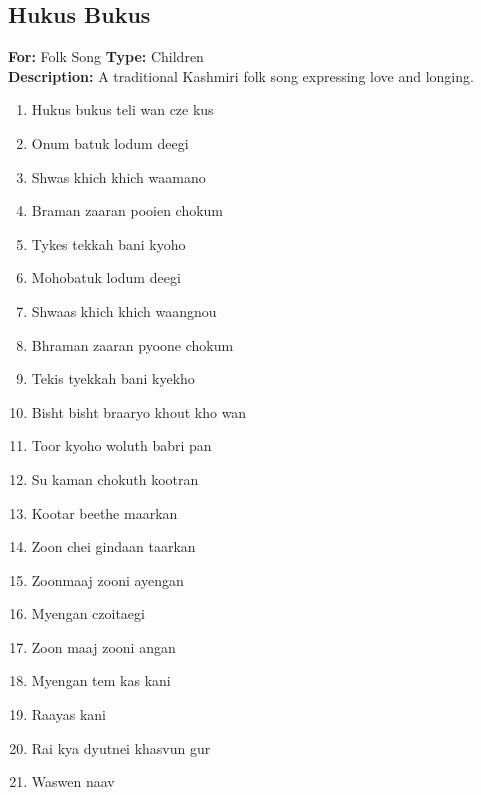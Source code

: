 \documentclass[12pt]{article}
\newcommand{\bigroman}[1]{\fontsize{16pt}{18pt}\selectfont\RaggedRight #1}
\begin{document}
\subsection*{Hukus Bukus}
\textbf{For:} Folk Song \quad \textbf{Type:} Children\\
\textbf{Description:} A traditional Kashmiri folk song expressing love and longing.

\begin{multicols}{2}
\begin{enumerate}[leftmargin=*, label=\arabic*., font=\fontsize{16pt}{18pt}\selectfont]
  \item \bigroman{Hukus bukus teli wan cze kus}
  \item \bigroman{Onum batuk lodum deegi}
  \item \bigroman{Shwas khich khich waamano}
  \item \bigroman{Braman zaaran pooien chokum}
  \item \bigroman{Tykes tekkah bani kyoho}
  \item \bigroman{Mohobatuk lodum deegi}
  \item \bigroman{Shwaas khich khich waangnou}
  \item \bigroman{Bhraman zaaran pyoone chokum}
  \item \bigroman{Tekis tyekkah bani kyekho}
  \item \bigroman{Bisht bisht braaryo khout kho wan}
  \item \bigroman{Toor kyoho woluth babri pan}
  \item \bigroman{Su kaman chokuth kootran}
  \item \bigroman{Kootar beethe maarkan}
  \item \bigroman{Zoon chei gindaan taarkan}
  \item \bigroman{Zoonmaaj zooni ayengan}
  \item \bigroman{Myengan czoitaegi}
  \item \bigroman{Zoon maaj zooni angan}
  \item \bigroman{Myengan tem kas kani}
  \item \bigroman{Raayas kani}
  \item \bigroman{Rai kya dyutnei khasvun gur}
  \item \bigroman{Waswen naav}
\end{enumerate}

\columnbreak


\end{multicols}
\end{document}
